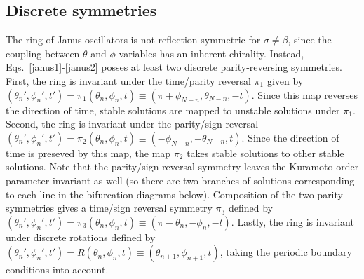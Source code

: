 \documentclass[aps,pre,amsmath,amssymb,floatfix,onecolumn,notitlepage,10pt]{revtex4-1}
\begin{document}
\subsection{Discrete symmetries}
The ring of Janus oscillators is not reflection symmetric for $\sigma \neq \beta$, since the coupling between $\theta$ and $\phi$ variables has an inherent chirality. Instead, Eqs.~\eqref{janus1}-\eqref{janus2} posses at least two discrete parity-reversing symmetries. First, the ring is invariant under the time/parity reversal $\pi_1$ given by $(\theta_n',\phi_n',t') = \pi_1(\theta_n,\phi_n,t) \equiv (\pi+\phi_{N-n},\theta_{N-n},-t)$. Since this map reverses the direction of time, stable solutions are mapped to unstable solutions under $\pi_1$.  Second, the ring is invariant under the parity/sign reversal $(\theta_n',\phi_n',t') = \pi_2(\theta_n,\phi_n,t) \equiv (-\phi_{N-n},-\theta_{N-n},t)$. Since the direction of time is preseved by this map, the map $\pi_2$ takes stable solutions to other stable solutions.  Note that the parity/sign reversal symmetry leaves the Kuramoto order parameter invariant as well (so there are two branches of solutions corresponding to each line in the bifurcation diagrams below). Composition of the two parity symmetries gives a time/sign reversal symmetry $\pi_3$ defined by $(\theta_n',\phi_n',t')=\pi_3(\theta_n,\phi_n,t)\equiv(\pi-\theta_n,-\phi_n,-t)$. Lastly, the ring is invariant under discrete rotations defined by $(\theta_n',\phi_n',t')=R(\theta_n,\phi_n,t)\equiv(\theta_{n+1},\phi_{n+1},t)$, taking the periodic boundary conditions into account.
\end{document}
